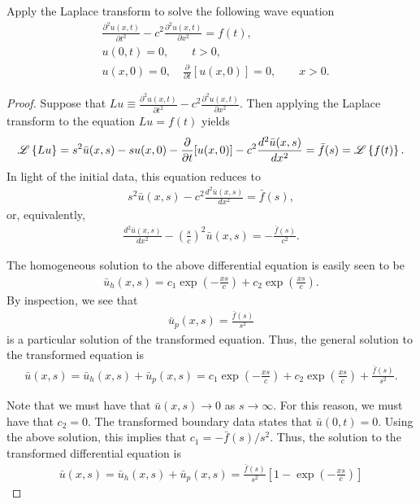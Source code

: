 \begin{problem}{4}
  Apply the Laplace transform to solve the following wave equation
  \begin{align*}
    & \frac{\partial^2 u(x, t)}{\partial t^2} - c^2\frac{\partial^2 u(x, t)}{\partial x^2} = f(t), \\
    & u(0, t) = 0 , \qquad t > 0, \\
    & u(x, 0) = 0, \quad \frac{\partial}{\partial t}\left[u(x, 0)\right] = 0, \qquad x > 0.
  \end{align*}
\end{problem}

\begin{proof}
  Suppose that $\displaystyle Lu \equiv \frac{\partial^2 u(x, t)}{\partial t^2} - c^2\frac{\partial^2 u(x, t)}{\partial x^2}$.
  Then applying the Laplace transform to the equation $Lu = f(t)$ yields
  \begin{align*}
    \mathscr{L}\left\{ {Lu} \right\} = s^2 \bar{u}(x,s) -s u(x, 0) - \frac{\partial}{\partial t}[u(x, 0)] -c^2 \frac{d^2\bar{u}(x,s)}{dx^2} = \bar{f}(s) = \mathscr{L}\left\{ {f(t)} \right\}.
  \end{align*}
  In light of the initial data, this equation reduces to
  \begin{align*}
    s^2 \bar{u}(x,s) -c^2 \frac{d^2\bar{u}(x,s)}{dx^2} = \bar{f}(s),
  \end{align*}
  or, equivalently,
  \begin{align*}
    \frac{d^2\bar{u}(x,s)}{dx^2} - \left(\frac{s}{c}\right)^2 \bar{u}(x,s) = -\frac{\bar{f}(s)}{c^2}.
  \end{align*}

  The homogeneous solution to the above differential equation is easily seen to be
  \begin{align*}
    \bar{u}_h(x,s) = c_1 \exp{\left(-\frac{xs}{c}\right)} + c_2 \exp{\left(\frac{xs}{c}\right)}.
  \end{align*}
  By inspection, we see that
  \begin{align*}
    \bar{u}_p(x, s) = \frac{\bar{f}(s)}{s^2}
  \end{align*}
  is a particular solution of the transformed equation. Thus, the general solution to the transformed
  equation is
  \begin{align*}
    \bar{u}(x, s) = \bar{u}_h(x,s) + \bar{u}_p(x, s) = c_1 \exp{\left(-\frac{xs}{c}\right)} + c_2 \exp{\left(\frac{xs}{c}\right)} + \frac{\bar{f}(s)}{s^2}.
  \end{align*}

  Note that we must have that $\bar{u}(x,s) \to 0$ as $s \to \infty$. For this reason, we must have that $c_2=0$.
  The transformed boundary data states that $\bar{u}(0, t) = 0$. Using the above solution, this implies that $c_1 = -\bar{f}(s)/s^2$.
  Thus, the solution to the transformed differential equation is
  \begin{align*}
    \bar{u}(x, s) = \bar{u}_h(x,s) + \bar{u}_p(x, s) = \frac{\bar{f}(s)}{s^2}\left[1-\exp{\left(-\frac{xs}{c}\right)}\right]
  \end{align*}


\end{proof}
